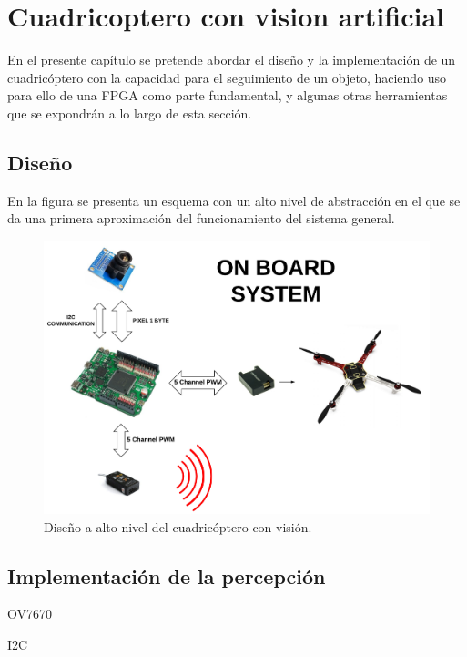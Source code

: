 \chapter{Cuadricoptero con vision artificial}\label{sec: Cuadricoptero}
En el presente capítulo se pretende abordar el diseño y la implementación de un cuadricóptero con la capacidad para el seguimiento de un objeto, haciendo uso para ello de una FPGA como parte fundamental, y algunas otras herramientas que se expondrán a lo largo de esta sección. \newline

\section{Diseño}
En la figura se presenta un esquema con un alto nivel de abstracción en el que se da una primera aproximación del funcionamiento del sistema general.

\begin{figure}[H]
	\center
	\includegraphics[trim = 0mm 4cm 0mm 4cm, clip,scale=0.5]{imagenes/Cuadricoptero_vision/on_board.pdf}
	\caption{Diseño a alto nivel del cuadricóptero con visión.}
	\label{fig:on_board}
\end{figure}


\section{Implementación de la percepción}
OV7670

I2C

